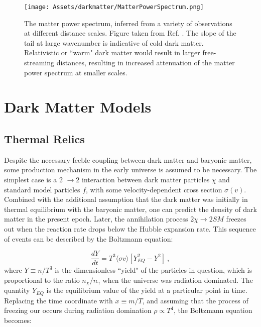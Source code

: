 \begin{figure}
    \centering
    \texttt{[image: Assets/darkmatter/MatterPowerSpectrum.png]}
    \caption[The matter power spectrum, inferred from a variety of observations at different distance scales.]{The matter power spectrum, inferred from a variety of observations at different distance scales.
    Figure taken from Ref. \cite{chabanier_matter_2019}.
    The slope of the tail at large wavenumber is indicative of cold dark matter.
    Relativistic or ``warm" dark matter would result in larger free-streaming distances, resulting in increased attenuation of the matter power spectrum at smaller scales.}
    \label{fig:matter_power_spectrum}
\end{figure}
\afterpage{\FloatBarrier}
\section{Dark Matter Models}
\subsection{Thermal Relics}
Despite the necessary feeble coupling between dark matter and baryonic matter, some production mechanism in the early universe is assumed to be necessary. 
The simplest case is a 2 $\rightarrow$2 interaction between dark matter particles $\chi$ and standard model particles $f$, with some velocity-dependent cross section $\sigma(v)$.
Combined with the additional assumption that the dark matter was initially in thermal equilibrium with the baryonic matter, one can predict the density of dark matter in the present epoch.
Later, the annihilation process $2 \chi\rightarrow 2 SM$ freezes out when the reaction rate drops below the Hubble expansion rate.
This sequence of events can be described by the Boltzmann equation:

\begin{equation}
    \frac{ d Y}{dt} = T^3 \langle \sigma v\rangle [Y_{EQ}^2 - Y^2]~,
    \label{eq:boltzmann}
\end{equation}
\noindent
where $Y\equiv n/T^3$ is the dimensionless ``yield" of the particles in question, which is proportional to the ratio $n_\chi/n_\gamma$ when the universe was radiation dominated.
The quantity $Y_{EQ}$ is the equilibrium value of the yield at a particular point in time.
Replacing the time coordinate with $x\equiv m/T$, and assuming that the process of freezing our occurs during radiation domination $\rho\propto T^4$, the Boltzmann equation becomes: 

